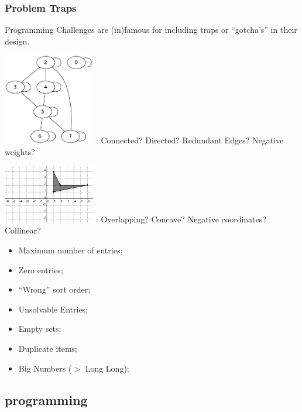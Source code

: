 \documentclass{beamer}
\begin{document}
\begin{frame}
  \frametitle{Problem Traps}
  Programming Challenges are (in)famous for including traps or
  ``gotcha's'' in their design.

  \includegraphics[width=0.3\textwidth]{img/graph1}    
  : Connected? Directed? Redundant Edges? Negative weights?

  \includegraphics[width=0.3\textwidth]{img/polygon} 
  : Overlapping? Concave? Negative coordinates? Collinear?

  \begin{itemize}
  \item Maximum number of entries;
  \item Zero entries;
  \item ``Wrong'' sort order;
  \item Unsolvable Entries;
  \item Empty sets;
  \item Duplicate items;
  \item Big Numbers ($>$ Long Long);
  \end{itemize}

\end{frame}

\subsection{programming}
\end{document}

